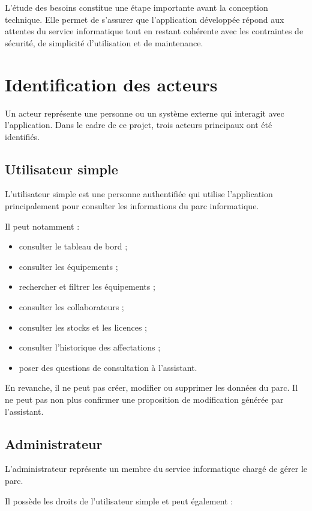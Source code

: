 \documentclass{rapportENSIAS}
\begin{document}
L’étude des besoins constitue une étape importante avant la conception technique. Elle permet de s’assurer que l’application développée répond aux attentes du service informatique tout en restant cohérente avec les contraintes de sécurité, de simplicité d’utilisation et de maintenance.

\section{Identification des acteurs}

Un acteur représente une personne ou un système externe qui interagit avec l’application. Dans le cadre de ce projet, trois acteurs principaux ont été identifiés.

\subsection{Utilisateur simple}

L’utilisateur simple est une personne authentifiée qui utilise l’application principalement pour consulter les informations du parc informatique.

Il peut notamment :

\begin{itemize}
\item consulter le tableau de bord ;
\item consulter les équipements ;
\item rechercher et filtrer les équipements ;
\item consulter les collaborateurs ;
\item consulter les stocks et les licences ;
\item consulter l’historique des affectations ;
\item poser des questions de consultation à l’assistant.
\end{itemize}

En revanche, il ne peut pas créer, modifier ou supprimer les données du parc. Il ne peut pas non plus confirmer une proposition de modification générée par l’assistant.

\subsection{Administrateur}

L’administrateur représente un membre du service informatique chargé de gérer le parc.

Il possède les droits de l’utilisateur simple et peut également :
\end{document}
